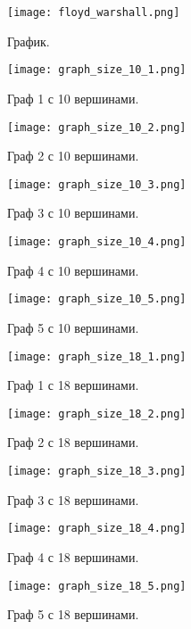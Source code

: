 \documentclass[12pt, a4paper]{report}
\begin{document}
	\begin{figure}[h]
		\centering
		\texttt{[image: floyd\_warshall.png]}
		\caption{График.}
	\end{figure}

	\begin{figure}[h]
		\centering
		\texttt{[image: graph\_size\_10\_1.png]}
		\caption{Граф 1 с 10 вершинами.}
	\end{figure}
	\begin{figure}[h]
		\centering
		\texttt{[image: graph\_size\_10\_2.png]}
		\caption{Граф 2 с 10 вершинами.}
	\end{figure}
	\begin{figure}[h]
		\centering
		\texttt{[image: graph\_size\_10\_3.png]}
		\caption{Граф 3 с 10 вершинами.}
	\end{figure}
	\begin{figure}[h]
		\centering
		\texttt{[image: graph\_size\_10\_4.png]}
		\caption{Граф 4 с 10 вершинами.}
	\end{figure}
	\begin{figure}[h]
		\centering
		\texttt{[image: graph\_size\_10\_5.png]}
		\caption{Граф 5 с 10 вершинами.}
	\end{figure} 

	\begin{figure}[h]
		\centering
		\texttt{[image: graph\_size\_18\_1.png]}
		\caption{Граф 1 с 18 вершинами.}
	\end{figure}
	\begin{figure}[h]
		\centering
		\texttt{[image: graph\_size\_18\_2.png]}
		\caption{Граф 2 с 18 вершинами.}
	\end{figure}
	\begin{figure}[h]
		\centering
		\texttt{[image: graph\_size\_18\_3.png]}
		\caption{Граф 3 с 18 вершинами.}
	\end{figure}
	\begin{figure}[h]
		\centering
		\texttt{[image: graph\_size\_18\_4.png]}
		\caption{Граф 4 с 18 вершинами.}
	\end{figure}
	\begin{figure}[h]
		\centering
		\texttt{[image: graph\_size\_18\_5.png]}
		\caption{Граф 5 с 18 вершинами.}
	\end{figure} 
\end{document}
